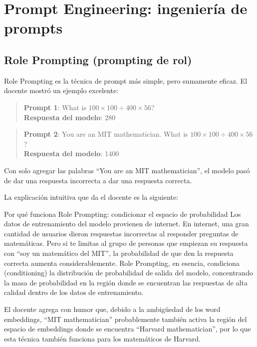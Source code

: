 \section{Prompt Engineering: ingeniería de prompts}

\subsection{Role Prompting (prompting de rol)}

Role Prompting es la técnica de prompt más simple, pero sumamente eficaz. El docente mostró un ejemplo excelente:

\begin{quote}
\textbf{Prompt 1}: What is $100 \times 100 \div 400 \times 56$? \\
\textbf{Respuesta del modelo}: 280 
\end{quote}

\begin{quote}
\textbf{Prompt 2}: You are an MIT mathematician. What is $100 \times 100 \div 400 \times 56$? \\
\textbf{Respuesta del modelo}: 1400 
\end{quote}

Con solo agregar las palabras ``You are an MIT mathematician'', el modelo pasó de dar una respuesta incorrecta a dar una respuesta correcta.

La explicación intuitiva que da el docente es la siguiente:

\begin{importantbox}{Por qué funciona Role Prompting: condicionar el espacio de probabilidad}
Los datos de entrenamiento del modelo provienen de internet. En internet, una gran cantidad de usuarios dieron respuestas incorrectas al responder preguntas de matemáticas. Pero si te limitas al grupo de personas que empiezan su respuesta con ``soy un matemático del MIT'', la probabilidad de que den la respuesta correcta aumenta considerablemente. Role Prompting, en esencia, condiciona (conditioning) la distribución de probabilidad de salida del modelo, concentrando la masa de probabilidad en la región donde se encuentran las respuestas de alta calidad dentro de los datos de entrenamiento.
\end{importantbox}

El docente agrega con humor que, debido a la ambigüedad de los word embeddings, ``MIT mathematician'' probablemente también activa la región del espacio de embeddings donde se encuentra ``Harvard mathematician'', por lo que esta técnica también funciona para los matemáticos de Harvard.

